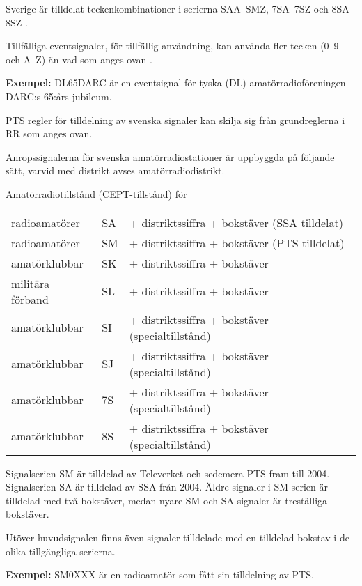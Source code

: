 Sverige är tilldelat teckenkombinationer i serierna SAA--SMZ, 7SA--7SZ och
8SA--8SZ \cite[Appendix 42]{ITU-RR}.

Tillfälliga eventsignaler, för tillfällig användning, kan använda fler tecken
(0--9 och A--Z) än vad som anges ovan \cite[§19.68A]{ITU-RR}.

\textbf{Exempel:} DL65DARC är en eventsignal för tyska (DL)
amatörradioföreningen DARC:s 65:års jubileum.

PTS regler för tilldelning av svenska signaler kan skilja sig från grundreglerna
i RR som anges ovan.

Anropssignalerna för svenska amatörradiostationer är uppbyggda på följande
sätt, varvid med distrikt avses amatörradiodistrikt.

Amatörradiotillstånd (CEPT-tillstånd) för

\begin{tabular}{lll}
radioamatörer & SA & + distriktssiffra + bokstäver (SSA tilldelat) \\
radioamatörer & SM & + distriktssiffra + bokstäver (PTS tilldelat) \\
amatörklubbar & SK & + distriktssiffra + bokstäver \\
militära förband & SL & + distriktssiffra + bokstäver \\
amatörklubbar & SI & + distriktssiffra + bokstäver (specialtillstånd) \\
amatörklubbar & SJ & + distriktssiffra + bokstäver (specialtillstånd) \\
amatörklubbar & 7S & + distriktssiffra + bokstäver (specialtillstånd) \\
amatörklubbar & 8S & + distriktssiffra + bokstäver (specialtillstånd) \\
\end{tabular}

Signalserien SM är tilldelad av Televerket och sedemera PTS fram till 2004.
Signalserien SA är tilldelad av SSA från 2004. Äldre signaler i SM-serien är
tilldelad med två bokstäver, medan nyare SM och SA signaler är treställiga
bokstäver.

Utöver huvudsignalen finns även signaler tilldelade med en tilldelad
bokstav i de olika tillgängliga serierna.

\textbf{Exempel:} SM0XXX är en radioamatör som fått sin tilldelning av PTS.

